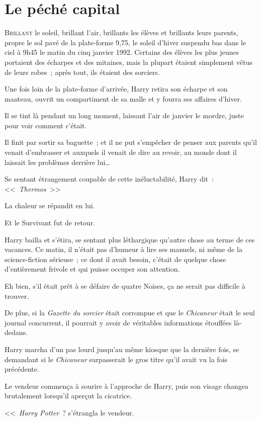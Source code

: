 \chapter{Le péché capital}

\lettrine{B}{rillant} le soleil, brillant l'air, brillants les élèves et brillants leurs parents, propre le sol pavé de la plate-forme 9,75, le soleil d'hiver suspendu bas dans le ciel à 9h45 le matin du cinq janvier 1992. Certains des élèves les plus jeunes portaient des écharpes et des mitaines, mais la plupart étaient simplement vêtus de leurs robes~; après tout, ils étaient des sorciers.

Une fois loin de la plate-forme d'arrivée, Harry retira son écharpe et son manteau, ouvrit un compartiment de sa malle et y fourra ses affaires d'hiver.

Il se tint là pendant un long moment, laissant l'air de janvier le mordre, juste pour voir comment c'était.

Il finit par sortir sa baguette~; et il ne put s'empêcher de penser aux parents qu'il venait d'embrasser et auxquels il venait de dire au revoir, au monde dont il laissait les problèmes derrière lui…

Se sentant étrangement coupable de cette inéluctabilité, Harry dit~: <<~\emph{Thermos}~>>

La chaleur se répandit en lui.

Et le Survivant fut de retour.

Harry bailla et s'étira, se sentant plus léthargique qu'autre chose au terme de ces vacances. Ce matin, il n'était pas d'humeur à lire ses manuels, ni même de la science-fiction sérieuse~; ce dont il avait besoin, c'était de quelque chose d'entièrement frivole et qui puisse occuper son attention.

Eh bien, s'il était prêt à se défaire de quatre Noises, ça ne serait pas difficile à trouver.

De plus, si la \emph{Gazette du sorcier} était corrompue et que le \emph{Chicaneur} était le seul journal concurrent, il pourrait y avoir de véritables informations étouffées là-dedans.

Harry marcha d'un pas lourd jusqu'au même kiosque que la dernière fois, se demandant si le \emph{Chicaneur} surpasserait le gros titre qu'il avait vu la fois précédente.

Le vendeur commença à sourire à l'approche de Harry, puis son visage changea brutalement lorsqu'il aperçut la cicatrice.

<<~\emph{Harry Potter}~? s'étrangla le vendeur.


